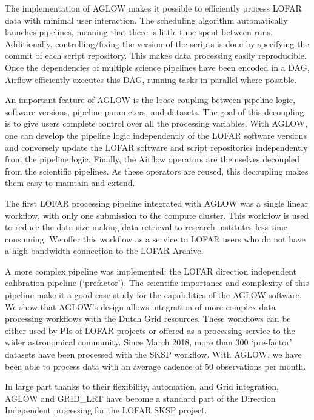 The implementation of AGLOW makes it possible to efficiently process LOFAR data with minimal user interaction. The scheduling algorithm automatically launches pipelines, meaning that there is little time spent between runs. Additionally, controlling/fixing the version of the scripts is done by specifying the commit of each script repository. This makes data processing easily reproducible. Once the dependencies of multiple science pipelines have been encoded in a DAG, Airflow efficiently executes this DAG, running tasks in parallel where possible. 

An important feature of AGLOW is the loose coupling between pipeline logic, software versions, pipeline parameters, and datasets. The goal of this decoupling is to give users complete control over all the processing variables. With AGLOW, one can develop the pipeline logic independently of the LOFAR software versions and conversely update the LOFAR software and script repositories independently from the pipeline logic. Finally, the Airflow operators are themselves decoupled from the scientific pipelines. As these operators are reused, this decoupling makes them easy to maintain and extend.

The first LOFAR processing pipeline integrated with AGLOW was a single linear workflow, with only one submission to the compute cluster. This workflow is used to reduce the data size making data retrieval to research institutes less time consuming. We offer this workflow as a service to LOFAR users who do not have a high-bandwidth connection to the LOFAR Archive. 

A more complex pipeline was implemented: the LOFAR direction independent calibration pipeline (`prefactor'). The scientific importance and complexity of this pipeline make it a good case study for the capabilities of the AGLOW software. We show that AGLOW's design allows integration of more complex data processing workflows with the Dutch Grid resources. These workflows can be either used by PIs of LOFAR projects or offered as a processing service to the wider astronomical community. Since March 2018, more than 300 `pre-factor' datasets have been processed with  the SKSP workflow. With AGLOW, we have been able to process data with an average cadence of 50 observations per month. 

In large part thanks to their flexibility, automation, and Grid integration, AGLOW and GRID\_LRT have become a standard part of the Direction Independent processing for the LOFAR SKSP project. 


